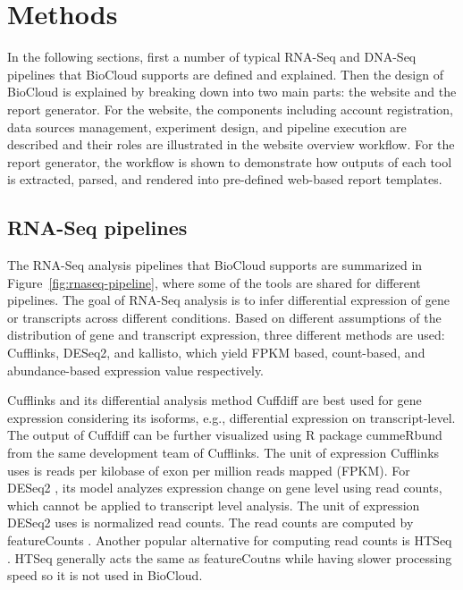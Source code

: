 \chapter{Methods}
\label{c:method}

In the following sections, first a number of typical RNA-Seq and DNA-Seq
pipelines that BioCloud supports are defined and explained. Then the design of
BioCloud is explained by breaking down into two main parts: the website and the
report generator. For the website, the components including account
registration, data sources management, experiment design, and pipeline
execution are described and their roles are illustrated in the website overview
workflow. For the report generator, the workflow is shown to demonstrate how
outputs of each tool is extracted, parsed, and rendered into pre-defined
web-based report templates.



\section{RNA-Seq pipelines}
\label{s:rnaseq-pipeline}

The RNA-Seq analysis pipelines that BioCloud supports are summarized in
Figure~\ref{fig:rnaseq-pipeline}, where some of the tools are shared for
different pipelines. The goal of RNA-Seq analysis is to infer differential
expression of gene or transcripts across different conditions. Based on
different assumptions of the distribution of gene and transcript expression,
three different methods are used: Cufflinks, DESeq2, and kallisto, which yield
FPKM based, count-based, and abundance-based expression value respectively.



Cufflinks \cite{trapnell2010:transcript} and its differential analysis method
Cuffdiff \cite{trapnell2013:differential} are best used for gene expression
considering its isoforms, e.g., differential expression on transcript-level.
The output of Cuffdiff can be further visualized using R package cummeRbund
\cite{:cummerbund} from the same development team of Cufflinks. The unit of
expression Cufflinks uses is reads per kilobase of exon per million reads
mapped (FPKM). For DESeq2 \cite{love2014:moderated}, its model analyzes
expression change on gene level using read counts, which cannot be applied to
transcript level analysis. The unit of expression DESeq2 uses is normalized
read counts. The read counts are computed by featureCounts
\cite{liao2014:featurecounts}.  Another popular alternative for computing read
counts is HTSeq \cite{anders2015:htseqa}. HTSeq generally acts the same as
featureCoutns while having slower processing speed so it is not used in
BioCloud.

